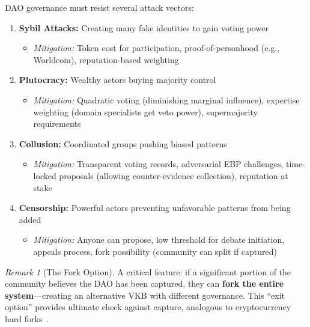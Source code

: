 \documentclass[11pt,a4paper]{article}
\theoremstyle{definition}
\theoremstyle{remark}
\newtheorem{remark}{Remark}[section]
\newcommand{\VKB}{\textsc{VKB}}
\newcommand{\EBP}{\textsc{EBP}}
\newcommand{\DAO}{\textsc{DAO}}
\begin{document}
\DAO{} governance must resist several attack vectors:

\begin{enumerate}
    \item \textbf{Sybil Attacks:} Creating many fake identities to gain voting power
    \begin{itemize}
        \item \textit{Mitigation:} Token cost for participation, proof-of-personhood (e.g., Worldcoin), reputation-based weighting
    \end{itemize}
    
    \item \textbf{Plutocracy:} Wealthy actors buying majority control
    \begin{itemize}
        \item \textit{Mitigation:} Quadratic voting (diminishing marginal influence), expertise weighting (domain specialists get veto power), supermajority requirements
    \end{itemize}
    
    \item \textbf{Collusion:} Coordinated groups pushing biased patterns
    \begin{itemize}
        \item \textit{Mitigation:} Transparent voting records, adversarial \EBP{} challenges, time-locked proposals (allowing counter-evidence collection), reputation at stake
    \end{itemize}
    
    \item \textbf{Censorship:} Powerful actors preventing unfavorable patterns from being added
    \begin{itemize}
        \item \textit{Mitigation:} Anyone can propose, low threshold for debate initiation, appeals process, fork possibility (community can split if captured)
    \end{itemize}
\end{enumerate}

\begin{remark}[The Fork Option]
A critical feature: if a significant portion of the community believes the \DAO{} has been captured, they can \textbf{fork the entire system}—creating an alternative \VKB{} with different governance. This ``exit option'' provides ultimate check against capture, analogous to cryptocurrency hard forks~\citep{nakamoto2008bitcoin}.
\end{remark}
\end{document}
